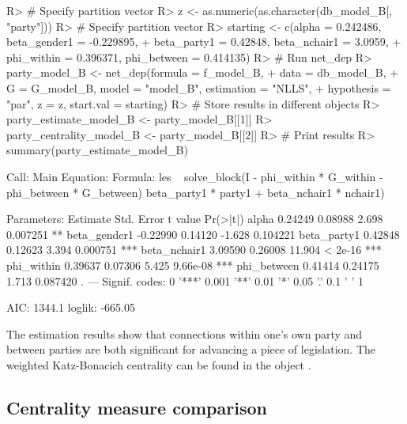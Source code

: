 \documentclass[nojss]{jss}
\begin{document}
	\begin{CodeChunk}
		\begin{CodeInput}
			R> # Specify partition vector
			R> z <- as.numeric(as.character(db_model_B[, "party"]))
			R> # Specify partition vector
			R> starting <- c(alpha = 0.242486, beta_gender1 = -0.229895,
			+    beta_party1 = 0.42848, beta_nchair1 = 3.0959,
			+    phi_within = 0.396371, phi_between = 0.414135)
			R> # Run net_dep
			R> party_model_B <- net_dep(formula = f_model_B,
			+    data = db_model_B,
			+    G = G_model_B, model = "model_B", estimation = "NLLS",
			+    hypothesis = "par", z = z, start.val = starting)
			R> # Store results in different objects
			R> party_estimate_model_B <- party_model_B[[1]]
			R> party_centrality_model_B <- party_model_B[[2]]
			R> # Print results
			R> summary(party_estimate_model_B)
		\end{CodeInput}
		\begin{CodeOutput}
			Call:
			Main Equation:  
			Formula: les ~ solve_block(I - phi_within * G_within - 
			phi_between * G_between) %
			beta_party1 * party1 + beta_nchair1 * nchair1)
			
			Parameters:
			Estimate Std. Error t value Pr(>|t|)    
			alpha         0.24249    0.08988   2.698 0.007251 ** 
			beta_gender1 -0.22990    0.14120  -1.628 0.104221    
			beta_party1   0.42848    0.12623   3.394 0.000751 ***
			beta_nchair1  3.09590    0.26008  11.904  < 2e-16 ***
			phi_within    0.39637    0.07306   5.425 9.66e-08 ***
			phi_between   0.41414    0.24175   1.713 0.087420 .  
			---
			Signif. codes:  0 '***' 0.001 '**' 0.01 '*' 0.05 '.' 0.1 ' ' 1
			
			AIC: 1344.1  loglik: -665.05
		\end{CodeOutput}
	\end{CodeChunk}
	
	
	The estimation results show that connections within one's own party and between parties are both significant for advancing a piece of legislation. The weighted Katz-Bonacich centrality can be found in the object .
	
	\subsection{Centrality measure comparison}
	
\end{document}
